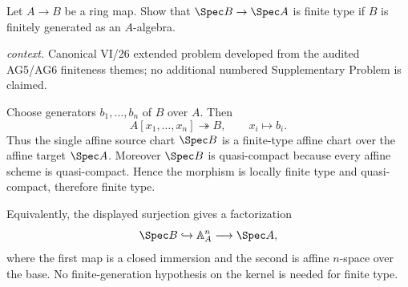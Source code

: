 \begin{problem}\label{prob:vi26-p05}
Let \(A\to B\) be a ring map.  Show that \(\Spec B\to\Spec A\) is finite type if \(B\) is finitely generated as an \(A\)-algebra.
\par\smallskip\noindent\textit{context.} Canonical VI/26 extended problem developed from the audited AG5/AG6 finiteness themes; no additional numbered Supplementary Problem is claimed.
\end{problem}

\ifdefined\FullProblemDossiers
\begin{solution}
Choose generators \(b_1,\ldots,b_n\) of \(B\) over \(A\).  Then
\[
A[x_1,\ldots,x_n]\twoheadrightarrow B,\qquad x_i\mapsto b_i.
\]
Thus the single affine source chart \(\Spec B\) is a finite-type affine chart over the affine target
\(\Spec A\).  Moreover \(\Spec B\) is quasi-compact because every affine scheme is
quasi-compact.  Hence the morphism is locally finite type and quasi-compact, therefore finite type.

Equivalently, the displayed surjection gives a factorization
\[
\Spec B\hookrightarrow\mathbb A^n_A\longrightarrow\Spec A,
\]
where the first map is a closed immersion and the second is affine \(n\)-space over the base.
No finite-generation hypothesis on the kernel is needed for finite type.
\end{solution}
\fi
